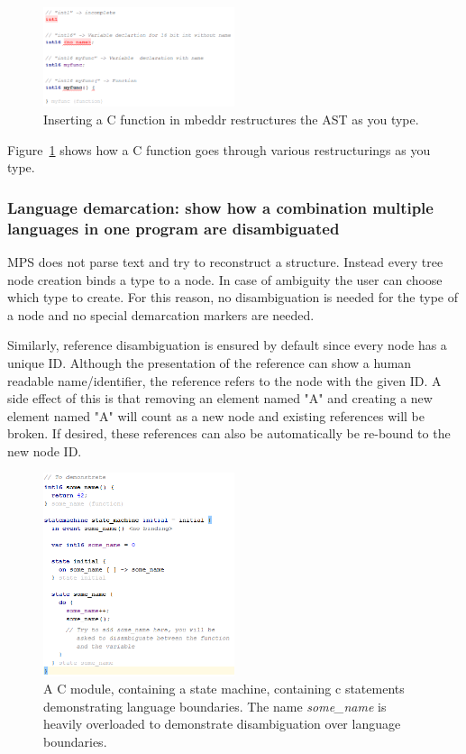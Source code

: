 \documentclass[preprint,numbers,10pt]{sigplanconf}
\begin{document}
\begin{figure}[H]
	\centering
	\includegraphics[width=0.5\textwidth]{screens/TypeAndRestructure.png}
	\caption{Inserting a C function in mbeddr restructures the AST as you type.}
	\label{fig:TypeAndRestructure}
\end{figure}
Figure~\ref{fig:TypeAndRestructure} shows how a C function goes through various restructurings as you type.

\subsubsection{Language demarcation: show how a combination multiple languages in one program are disambiguated}
MPS does not parse text and try to reconstruct a structure. Instead every tree node creation binds a type to a node. In case of ambiguity the user can choose which type to create. For this reason, no disambiguation is needed for the type of a node and no special demarcation markers are needed.

Similarly, reference disambiguation is ensured by default since every node has a unique ID. Although the presentation of the reference can show a human readable name/identifier, the reference refers to the node with the given ID. A side effect of this is that removing an element named "A" and creating a new element named "A" will count as a new node and existing references will be broken. If desired, these references can also be automatically be re-bound to the new node ID.

\begin{figure}[H]
	\centering
	\includegraphics[width=0.5\textwidth]{screens/LanguageDemarcationAndAmbiguity.png}
	\caption{A C module, containing a state machine, containing c statements demonstrating language boundaries. The name \emph{some\_name} is heavily overloaded to demonstrate disambiguation over language boundaries.}
	\label{fig:LanguageDemarcationAndAmbiguity}
\end{figure}
\end{document}
